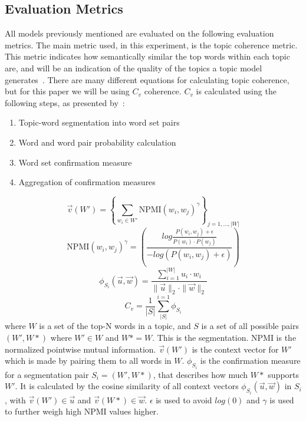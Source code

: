 \subsection{Evaluation Metrics}\label{sec:experiment_metrics}
All models previously mentioned are evaluated on the following evaluation metrics.
The main metric used, in this experiment, is the topic coherence metric.
This metric indicates how semantically similar the top words within each topic are, and will be an indication of the quality of the topics a topic model generates~\cite{topic_coherence_2015}.
There are many different equations for calculating topic coherence, but for this paper we will be using $C_v$ coherence.
$C_v$ is calculated using the following steps, as presented by~\citet{Syed2017coherence}:
\begin{enumerate}
	\item Topic-word segmentation into word set pairs
	\item Word and word pair probability calculation
	\item Word set confirmation measure
	\item Aggregation of confirmation measures
\end{enumerate}
\begin{equation}
	\overrightarrow{v}(W') = \left\{ \sum_{w_i \in W'} \text{NPMI}(w_i, w_j)^\gamma \right\}_{j=1,\dots,|W|}
\end{equation}
\begin{equation}
	\text{NPMI}(w_i,w_j)^\gamma = \left( \frac
	{log\frac{P(w_i,w_j) + \epsilon}{P(w_i)\cdot P(w_j)}}
	{-log(P(w_i,w_j) + \epsilon)} \right)
\end{equation}
\begin{equation}
	\phi_{S_i}(\overrightarrow{u}, \overrightarrow{w}) = \frac
	{\sum_{i = 1}^{|W|} u_i \cdot w_i}
	{\|\overrightarrow{u}\|_2 \cdot \|\overrightarrow{w}\|_2}
\end{equation}
\begin{equation}
	C_v = \frac{1}{|S|}\sum_{|S|}^{i=1}\phi_{S_i}
\end{equation}
\noindent where $W$ is a set of the top-N words in a topic, and $S$ is a set of all possible pairs $(W',W*)$ where $W'\in W$ and $W* = W$.
This is the segmentation.
NPMI is the normalized pointwise mutual information.
$\overrightarrow{v}(W')$ is the context vector for $W'$ which is made by pairing them to all words in $W$.
$\phi_{S_i}$ is the confirmation measure for a segmentation pair $S_i = (W',W*)$, that describes how much $W*$ supports $W'$.
It is calculated by the cosine similarity of all context vectors $\phi_{S_i}(\overrightarrow{u},\overrightarrow{w})$ in $S_i$, with $\overrightarrow{v}(W') \in \overrightarrow{u}$ and $\overrightarrow{v}(W*) \in \overrightarrow{w}$.
$\epsilon$ is used to avoid $log(0)$ and $\gamma$ is used to further weigh high NPMI values higher.


